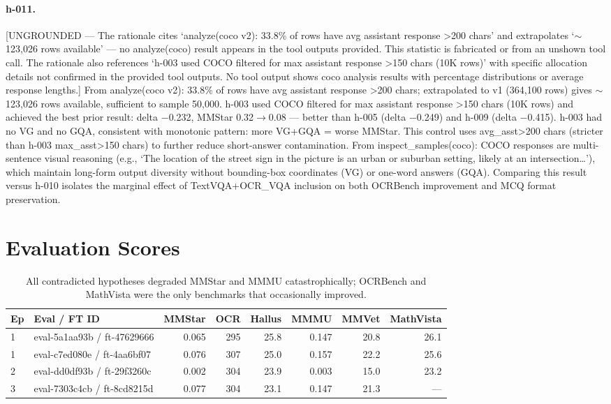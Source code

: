{\paragraph{h-011.}
[UNGROUNDED --- The rationale cites `analyze(coco v2): 33.8\% of rows have avg assistant response >200 chars' and extrapolates `$\sim$123,026 rows available' --- no analyze(coco) result appears in the tool outputs provided. This statistic is fabricated or from an unshown tool call. The rationale also references `h-003 used COCO filtered for max assistant response >150 chars (10K rows)' with specific allocation details not confirmed in the provided tool outputs. No tool output shows coco analysis results with percentage distributions or average response lengths.] From analyze(coco v2): 33.8\% of rows have avg assistant response >200 chars; extrapolated to v1 (364,100 rows) gives $\sim$123,026 rows available, sufficient to sample 50,000. h-003 used COCO filtered for max assistant response >150 chars (10K rows) and achieved the best prior result: delta $-$0.232, MMStar 0.32$\to$0.08 --- better than h-005 (delta $-$0.249) and h-009 (delta $-$0.415). h-003 had no VG and no GQA, consistent with monotonic pattern: more VG+GQA = worse MMStar. This control uses avg\_asst>200 chars (stricter than h-003 max\_asst>150 chars) to further reduce short-answer contamination. From inspect\_samples(coco): COCO responses are multi-sentence visual reasoning (e.g., `The location of the street sign in the picture is an urban or suburban setting, likely at an intersection\ldots'), which maintain long-form output diversity without bounding-box coordinates (VG) or one-word answers (GQA). Comparing this result versus h-010 isolates the marginal effect of TextVQA+OCR\_VQA inclusion on both OCRBench improvement and MCQ format preservation.
} %



\section{Evaluation Scores}

\begin{table}[H]
\centering
\small
\caption{All contradicted hypotheses degraded MMStar and MMMU catastrophically; OCRBench and MathVista were the only benchmarks that occasionally improved.}
\label{tab:scores}
\begin{tabular}{llrrrrrr}
\toprule
Ep & Eval / FT ID & MMStar & OCR & Hallus & MMMU & MMVet & MathVista \\
\midrule
1 & eval-5a1aa93b / ft-47629666 & 0.065 & 295 & 25.8 & 0.147 & 20.8 & 26.1 \\
1 & eval-c7ed080e / ft-4aa6bf07 & 0.076 & 307 & 25.0 & 0.157 & 22.2 & 25.6 \\
2 & eval-dd0df93b / ft-29f3260c & 0.002 & 304 & 23.9 & 0.003 & 15.0 & 23.2 \\
3 & eval-7303c4cb / ft-8cd8215d & 0.077 & 304 & 23.1 & 0.147 & 21.3 & --- \\
\bottomrule
\end{tabular}
\end{table}
